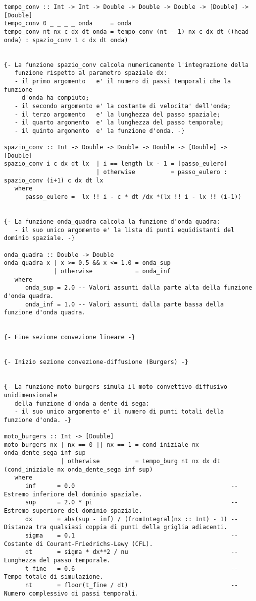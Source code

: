 \begin{verbatim}
tempo_conv :: Int -> Int -> Double -> Double -> Double -> [Double] -> [Double]
tempo_conv 0 _ _ _ _ onda     = onda
tempo_conv nt nx c dx dt onda = tempo_conv (nt - 1) nx c dx dt ((head onda) : spazio_conv 1 c dx dt onda) 


{- La funzione spazio_conv calcola numericamente l'integrazione della
   funzione rispetto al parametro spaziale dx:
   - il primo argomento   e' il numero di passi temporali che la funzione
     d'onda ha compiuto;
   - il secondo argomento e' la costante di velocita' dell'onda;      
   - il terzo argomento   e' la lunghezza del passo spaziale;
   - il quarto argomento  e' la lunghezza del passo temporale;
   - il quinto argomento  e' la funzione d'onda. -}

spazio_conv :: Int -> Double -> Double -> Double -> [Double] -> [Double] 
spazio_conv i c dx dt lx  | i == length lx - 1 = [passo_eulero]
                          | otherwise          = passo_eulero : spazio_conv (i+1) c dx dt lx
   where
      passo_eulero =  lx !! i - c * dt /dx *(lx !! i - lx !! (i-1))


{- La funzione onda_quadra calcola la funzione d'onda quadra:
   - il suo unico argomento e' la lista di punti equidistanti del dominio spaziale. -}

onda_quadra :: Double -> Double
onda_quadra x | x >= 0.5 && x <= 1.0 = onda_sup
              | otherwise            = onda_inf
   where
      onda_sup = 2.0 -- Valori assunti dalla parte alta della funzione d'onda quadra.
      onda_inf = 1.0 -- Valori assunti dalla parte bassa della funzione d'onda quadra.


{- Fine sezione convezione lineare -}


{- Inizio sezione convezione-diffusione (Burgers) -}


{- La funzione moto_burgers simula il moto convettivo-diffusivo unidimensionale
   della funzione d'onda a dente di sega:
   - il suo unico argomento e' il numero di punti totali della funzione d'onda. -}

moto_burgers :: Int -> [Double]
moto_burgers nx | nx == 0 || nx == 1 = cond_iniziale nx onda_dente_sega inf sup                       
                | otherwise          = tempo_burg nt nx dx dt (cond_iniziale nx onda_dente_sega inf sup)
   where
      inf      = 0.0                                            -- Estremo inferiore del dominio spaziale. 
      sup      = 2.0 * pi                                       -- Estremo superiore del dominio spaziale. 
      dx       = abs(sup - inf) / (fromIntegral(nx :: Int) - 1) -- Distanza tra qualsiasi coppia di punti della griglia adiacenti.
      sigma    = 0.1                                            -- Costante di Courant-Friedrichs-Lewy (CFL).
      dt       = sigma * dx**2 / nu                             -- Lunghezza del passo temporale.
      t_fine   = 0.6                                            -- Tempo totale di simulazione.
      nt       = floor(t_fine / dt)                             -- Numero complessivo di passi temporali.



\end{verbatim}
